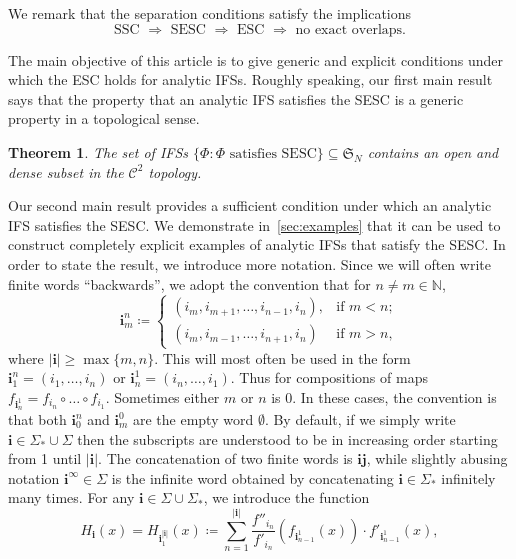 \documentclass[11pt,a4paper]{article}
\def\cref#1{\ref{#1}}%
\newtheorem{theorem}{Theorem}[section]
\theoremstyle{definition}
\theoremstyle{remark}
\newcommand{\0}{\mathbf{0}}
\newcommand{\bi}{\mathbf{i}}
\newcommand{\bj}{\mathbf{j}}
\numberwithin{equation}{section}
\begin{document}
We remark that the separation conditions satisfy the implications 
\[
  \text{SSC $\Rightarrow$ SESC $\Rightarrow$ ESC
  $\Rightarrow$ no exact overlaps.} 
\]



The main objective of this article is to give generic and explicit conditions under which the
ESC holds for analytic IFSs. Roughly speaking, our first
main result says that the property that an analytic IFS satisfies the SESC is a generic property in
a topological sense.

\begin{theorem}\label{thm:ESCOpenDense}
  The set of IFSs $\{\Phi \colon \Phi\text{ satisfies SESC}\}\subseteq \mathfrak{S}_N$ contains an open and
  dense subset in the $\mathcal{C}^2$ topology.
\end{theorem}
Our second main result provides a sufficient condition under which an analytic IFS satisfies the
SESC. We demonstrate in~\cref{sec:examples} that it can be used to construct completely explicit
examples of analytic IFSs that satisfy the SESC. In order to state the result, we introduce more
notation. Since we will often write finite words ``backwards'', we adopt the convention that for
$n\neq m\in\mathbb{N}$,
\begin{equation*}
	\bi_m^n\coloneqq
	\begin{cases}
		(i_m,i_{m+1},\ldots,i_{n-1},i_n), &\text{if } m<n; \\
		(i_m,i_{m-1},\ldots,i_{n+1},i_n) &\text{if } m>n,
	\end{cases}
\end{equation*}
where $|\bi|\geq\max\{m,n\}$. This will most often be used in the form $\bi_1^n=(i_1,\ldots,i_n)$ or
$\bi_n^1=(i_n,\ldots,i_1)$. Thus for compositions of maps $f_{\bi_n^1}=f_{i_n}\circ \dots \circ
f_{i_1}$. Sometimes either $m$ or $n$ is $0$. In these cases, the convention is that both $\bi_0^n$
and $\bi_m^0$ are the empty word $\emptyset$. By default, if we simply write
$\bi\in\Sigma_*\cup\Sigma$ then the subscripts are understood to be in increasing order starting
from 1 until $|\bi|$. The concatenation of two finite words is $\bi\bj$, while slightly abusing
notation $\bi^{\infty}\in \Sigma$ is the infinite word obtained by concatenating $\bi\in\Sigma_*$
infinitely many times. 
For any $\bi\in \Sigma\cup\Sigma_*$, we introduce the function 
\begin{equation}\label{eq:H_i(x)}
H_{\bi}(x)=H_{\bi_{1}^{|\bi|}}(x) \coloneqq \sum_{n=1}^{|\bi|}
\frac{f''_{i_n}}{f'_{i_n}}(f_{\bi_{n-1}^1}(x))\cdot f'_{\bi_{n-1}^1}(x),
\end{equation}
\end{document}
